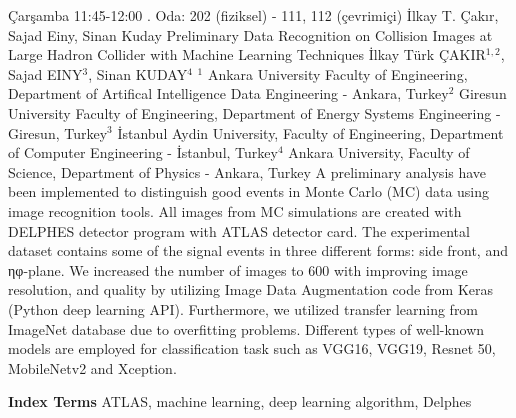 
    \begin{abstract_basarim}
    {Çarşamba 11:45-12:00}
    {.}
    {Oda: 202 (fiziksel) - 111, 112 (çevrimiçi)}
    {İlkay T. Çakır, Sajad Einy, Sinan Kuday}
    {Preliminary Data Recognition on Collision Images at Large Hadron Collider with Machine Learning Techniques}
    {%
    İlkay Türk ÇAKIR$^{1,2}$, Sajad EINY$^{3}$, Sinan KUDAY$^{4}$}
    {%
    }
    {%
    $^1$ Ankara University Faculty of Engineering, Department of Artifical Intelligence Data Engineering - Ankara, Turkey\newline{}$^2$ Giresun University Faculty of Engineering, Department of Energy Systems Engineering - Giresun, Turkey\newline{}$^3$ İstanbul Aydin University, Faculty of Engineering, Department of Computer Engineering - İstanbul, Turkey\newline{}$^4$ Ankara University, Faculty of Science, Department of Physics - Ankara, Turkey}
    A preliminary analysis have been implemented to distinguish good events in Monte Carlo (MC) data using image recognition tools. All images from MC simulations are created with DELPHES detector program with ATLAS detector card. The experimental dataset contains some of the signal events in three different forms: side front, and ηφ-plane. We increased the number of images to 600 with improving image resolution, and quality by utilizing Image Data Augmentation code from Keras (Python deep learning API). Furthermore, we utilized transfer learning from ImageNet database due to overfitting problems. Different types of well-known models are employed for classification task such as VGG16, VGG19, Resnet 50, MobileNetv2 and Xception.  
    
            \textbf{Index Terms} \newline{}ATLAS, machine learning, deep learning algorithm, Delphes
    \end{abstract_basarim}
    